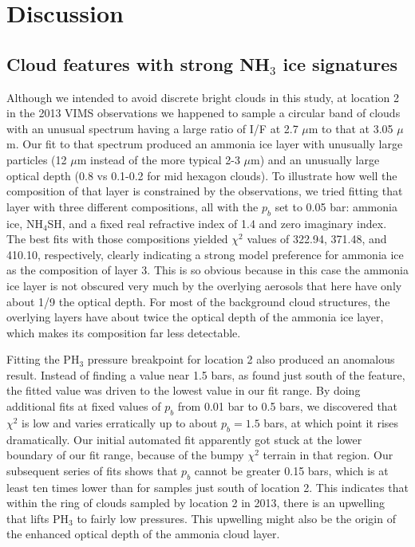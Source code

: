 \documentclass[article,11pt]{emulateapj}
\def\mum{$\mu$m }
\def\mumx{$\mu$m}
\def\chisq{$\chi^2$ }
\def\pht{PH$_3$ }
\def\nht{NH$_3$ }
\def\nhfshx{NH$_4$SH}
\begin{document}
\section{Discussion}

\subsection{Cloud features with strong \nht ice signatures}\label{Sec:nh3ice}

Although we intended to avoid discrete bright clouds in this study, at location 2 in
the 2013 VIMS observations we happened to sample a circular band of clouds with
an unusual spectrum having a large ratio of I/F at 2.7 \mum to that at
3.05 \mumx.  Our fit to that spectrum produced an ammonia ice layer
with unusually large particles (12 \mum instead of the more typical
2-3 \mumx) and an unusually large optical depth (0.8 vs 0.1-0.2 for mid
hexagon clouds).  To illustrate how well the composition of that layer
is constrained by the observations, we tried fitting that layer with
three different compositions, all with the $p_b$ set to 0.05 bar:
ammonia ice, \nhfshx, and a fixed real refractive index of 1.4 and zero
imaginary index.  The best fits with those compositions yielded
\chisq values of 322.94, 371.48, and 410.10, respectively, clearly
indicating a strong model preference for ammonia ice as the
composition of layer 3.  This is so obvious because in this case the ammonia ice
layer is not obscured very much by the overlying aerosols that here have
only about 1/9 the optical depth.  For most of the background cloud structures,
the overlying layers have about twice the optical depth of the ammonia ice layer,
which makes its composition far less detectable.  

Fitting the \pht
pressure breakpoint for location 2 also produced an anomalous result.
Instead of finding a value near 1.5 bars, as found just south of the
feature, the fitted value was driven to the lowest value in our fit
range.  By doing additional fits at fixed values of $p_b$ from 0.01
bar to 0.5 bars, we discovered that \chisq is low and varies
erratically up to about $p_b = 1.5$ bars, at which point it rises
dramatically.  Our initial automated fit apparently got stuck
at the lower boundary of our fit range, because of the bumpy
\chisq terrain in that region.  Our subsequent series of fits
shows that $p_b$ cannot be greater 0.15 bars,
which is at least ten times lower than for samples just south of
location 2. This indicates that within the ring of clouds sampled by
location 2 in 2013, there is an upwelling that lifts \pht to fairly
low pressures.  This upwelling might also be the origin of the
enhanced optical depth of the ammonia cloud layer.  
\end{document}
